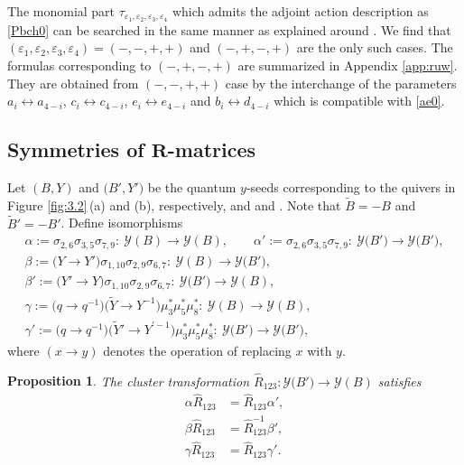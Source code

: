 \documentclass[pdftex]{sigma}
\def\ve{{\varepsilon}}
\numberwithin{equation}{section}
\newtheorem{Proposition}[Theorem]{Proposition}
 { \theoremstyle{definition}
\newtheorem{Example}[Theorem]{Example}
\newtheorem{Remark}[Theorem]{Remark} }
\begin{document}
The monomial part $\tau_{\ve_1,\ve_2,\ve_3,\ve_4}$ which admits the
adjoint action description as \eqref{Pbch0} can be searched in the
same manner as explained around \cite[equation~(4.27)]{IKT2}. We find
that $(\ve_1,\ve_2,\ve_3,\allowbreak\ve_4)=(-,-,+,+)$ and $(-,+,-,+)$ are the
only such cases. The formulas corresponding to $(-,+,-,+)$ are
summarized in Appendix \ref{app:ruw}. They are obtained from
$(-,-,+,+)$ case by the interchange of the parameters
$a_i \leftrightarrow a_{4-i}$, $c_i \leftrightarrow c_{4-i}$,
$e_i \leftrightarrow e_{4-i}$ and $b_i \leftrightarrow d_{4-i}$ which
is compatible with \eqref{ae0}.



\subsection[Symmetries of R-matrices]{Symmetries of $\boldsymbol{R}$-matrices}\label{ss:symR}

Let $(B,Y)$ and $\bigl(B',Y'\bigr)$ be the quantum $y$-seeds corresponding to
the quivers in Figure \ref{fig:3.2}\,(a) and (b), respectively, and
 and
. Note
that $\widetilde{B} = -B$ and $\widetilde{B}' = -B'$. Define
isomorphisms
\begin{gather*}
 \alpha
 := \sigma_{2,6} \sigma_{3,5} \sigma_{7,9}
\colon\ \mathcal{Y}(B) \to \mathcal{Y}(B),
 \qquad
 \alpha'
 := \sigma_{2,6} \sigma_{3,5} \sigma_{7,9}
\colon\ \mathcal{Y}\bigl(B'\bigr) \to \mathcal{Y}\bigl(B'\bigr),
 \\
 \beta
 := \bigl(Y \to Y'\bigr) \sigma_{1,10} \sigma_{2,9} \sigma_{6,7}
\colon\ \mathcal{Y}(B) \to \mathcal{Y}\bigl(B'\bigr),
 \\
 \beta'
 := \bigl(Y' \to Y\bigr) \sigma_{1,10} \sigma_{2,9} \sigma_{6,7}
\colon\ \mathcal{Y}\bigl(B'\bigr) \to \mathcal{Y}(B),
 \\
 \gamma
 := \bigl(q \to q^{-1}\bigr) \bigl(\widetilde{Y} \to Y^{-1}\bigr) \mu_3^* \mu_5^* \mu_8^*
\colon\ \mathcal{Y}(B) \to \mathcal{Y}(B),
 \\
 \gamma'
 := \bigl(q \to q^{-1}\bigr) \bigl(\widetilde{Y}' \to Y^{\prime-1}\bigr) \mu_3^* \mu_5^* \mu_8^*
 \colon\ \mathcal{Y}\bigl(B'\bigr) \to \mathcal{Y}\bigl(B'\bigr),
\end{gather*}
where $(x \to y)$ denotes the operation of replacing $x$ with $y$.

\begin{Proposition}
 The cluster transformation
 $\widehat{R}_{123}\colon \mathcal{Y}\bigl(B'\bigr) \to \mathcal{Y}(B)$
 satisfies
 \begin{align}
 \label{sym-alpha}
 \alpha\widehat{R}_{123} &= \widehat{R}_{123} \alpha',
 \\
 \label{sym-beta}
 \beta\widehat{R}_{123} &= \widehat{R}_{123}^{-1} \beta',
 \\
 \label{sym-gamma}
 \gamma\widehat{R}_{123} &= \widehat{R}_{123} \gamma'.
 \end{align}
 \end{Proposition}
\end{document}
